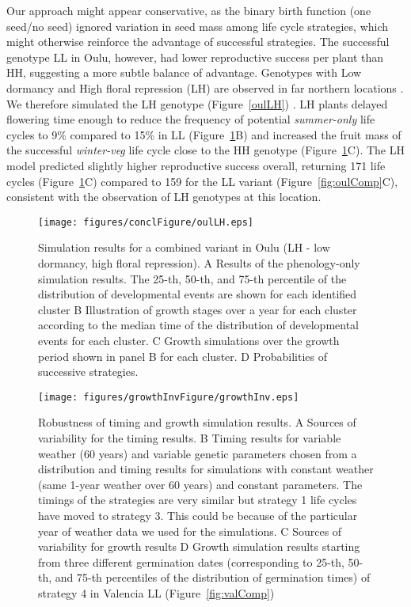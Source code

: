 Our approach might appear conservative, as the binary birth function (one
seed/no seed) ignored variation in seed mass among life cycle strategies, which
might otherwise reinforce the advantage of successful strategies. The successful
genotype LL in Oulu, however, had lower reproductive success per plant than HH,
suggesting a more subtle balance of advantage. Genotypes with Low dormancy and
High floral repression (LH) are observed in far northern locations
\citep{atwell_genome-wide_2010}. We therefore simulated the LH genotype (Figure~\ref{oulLH})
. LH plants delayed flowering time enough to reduce the frequency of potential
\emph{summer-only} life cycles to 9\% compared to 15\% in LL
(Figure~\ref{fig:oulLH}B) and increased the fruit mass of the successful
\emph{winter-veg} life cycle close to the HH genotype
(Figure~\ref{fig:oulLH}C). The LH model predicted slightly higher reproductive
success overall, returning 171 life cycles (Figure~\ref{fig:oulLH}C) compared to
159 for the LL variant (Figure~\ref{fig:oulComp}C), consistent with the
observation of LH genotypes at this location.

\begin{figure}[tb]
\centering
\texttt{[image: figures/conclFigure/oulLH.eps]}
\caption{Simulation results for a combined variant in Oulu (LH - low dormancy,
  high floral repression). A Results of the phenology-only simulation
  results. The 25-th, 50-th, and 75-th percentile of the distribution of
  developmental events are shown for each identified cluster B Illustration of
  growth stages over a year for each cluster according to the median time of the
  distribution of developmental events for each cluster. C Growth simulations
  over the growth period shown in panel B for each cluster.  D Probabilities of
  successive strategies.}
\label{fig:oulLH}
\end{figure}

\begin{figure}[tb]
\centering
\texttt{[image: figures/growthInvFigure/growthInv.eps]}
\caption{Robustness of timing and growth simulation results.  A Sources of
  variability for the timing results. B Timing results for variable weather (60
  years) and variable genetic parameters chosen from a distribution and timing
  results for simulations with constant weather (same 1-year weather over 60
  years) and constant parameters. The timings of the strategies are very similar
  but strategy 1 life cycles have moved to strategy 3. This could be because of
  the particular year of weather data we used for the simulations. C Sources of
  variability for growth results D Growth simulation results starting from three
  different germination dates (corresponding to 25-th, 50-th, and 75-th
  percentiles of the distribution of germination times) of strategy 4 in
  Valencia LL (Figure~\ref{fig:valComp})}
\label{fig:growthInv}
\end{figure}

